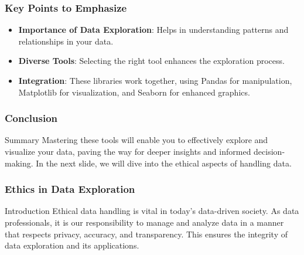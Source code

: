 \documentclass[aspectratio=169]{beamer}
\begin{document}
\begin{frame}
    \frametitle{Key Points to Emphasize}
    \begin{itemize}
        \item \textbf{Importance of Data Exploration}: Helps in understanding patterns and relationships in your data.
        \item \textbf{Diverse Tools}: Selecting the right tool enhances the exploration process.
        \item \textbf{Integration}: These libraries work together, using Pandas for manipulation, Matplotlib for visualization, and Seaborn for enhanced graphics.
    \end{itemize}
\end{frame}

\begin{frame}
    \frametitle{Conclusion}
    \begin{block}{Summary}
        Mastering these tools will enable you to effectively explore and visualize your data, paving the way for deeper insights and informed decision-making. In the next slide, we will dive into the ethical aspects of handling data.
    \end{block}
\end{frame}

\begin{frame}[fragile]
    \frametitle{Ethics in Data Exploration}
    \begin{block}{Introduction}
        Ethical data handling is vital in today’s data-driven society. As data professionals, it is our responsibility to manage and analyze data in a manner that respects privacy, accuracy, and transparency. This ensures the integrity of data exploration and its applications.
    \end{block}
\end{frame}
\end{document}
